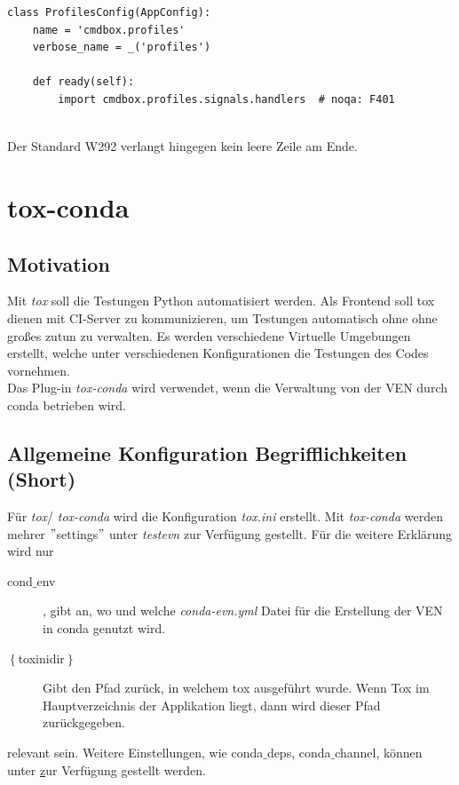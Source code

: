 \begin{lstlisting}[style=python, caption={Gutes Beispiel}, captionpos=b]
class ProfilesConfig(AppConfig):
    name = 'cmdbox.profiles'
    verbose_name = _('profiles')

    def ready(self):
        import cmdbox.profiles.signals.handlers  # noqa: F401
        
\end{lstlisting}
Der Standard W292 verlangt hingegen kein leere Zeile am Ende.

\section{tox-conda}

\subsection{Motivation}
Mit \textit{tox} soll die Testungen Python automatisiert werden. Als Frontend soll tox dienen mit CI-Server zu kommunizieren, um Testungen automatisch ohne ohne großes zutun zu verwalten. Es werden verschiedene Virtuelle Umgebungen erstellt, welche unter verschiedenen Konfigurationen die Testungen des Codes vornehmen.\\

Das Plug-in \textit{tox-conda} wird verwendet, wenn die Verwaltung von der \gls{VEN} durch conda betrieben wird.


\subsection{Allgemeine Konfiguration Begrifflichkeiten (Short)} 
Für \textit{tox}/ \textit{tox-conda} wird die Konfiguration \textit{tox.ini} erstellt. Mit \textit{tox-conda} werden mehrer $"$settings$"$ unter \textit{testevn} zur Verfügung gestellt. Für die weitere Erklärung wird nur
\begin{description}
	\item[cond$\_$env], gibt an, wo und welche \textit{conda-evn.yml} Datei für die Erstellung der \gls{VEN} in conda genutzt wird.
	\item[$\left\lbrace \right. $toxinidir$\left.\right\rbrace$] Gibt den Pfad zurück, in welchem tox ausgeführt wurde. Wenn Tox im Hauptverzeichnis der Applikation liegt, dann wird dieser Pfad zurückgegeben.
\end{description}
relevant sein. Weitere Einstellungen, wie conda$\_$deps, conda$\_$channel, können unter \href{https://github.com/tox-dev/tox-conda} zur Verfügung gestellt werden.

